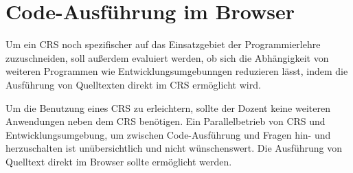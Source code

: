 \section{Code-Ausführung im Browser}
\label{chap:codeausfuehrung}
Um ein CRS noch spezifischer auf das Einsatzgebiet der Programmierlehre zuzuschneiden, soll außerdem evaluiert werden, ob sich die Abhängigkeit von weiteren Programmen wie Entwicklungsumgebunngen reduzieren lässt, indem die Ausführung von Quelltexten direkt im CRS ermöglicht wird.

Um die Benutzung eines CRS zu erleichtern, sollte der Dozent keine weiteren Anwendungen neben dem CRS benötigen. Ein Parallelbetrieb von CRS und Entwicklungsumgebung, um zwischen Code-Ausführung und Fragen hin- und herzuschalten ist unübersichtlich und nicht wünschenswert. Die Ausführung von Quelltext direkt im Browser sollte ermöglicht werden.
